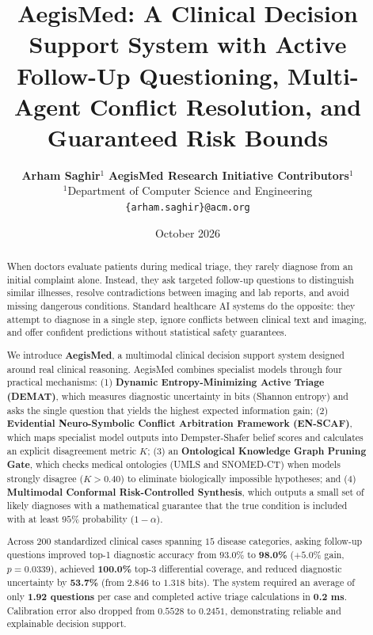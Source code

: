 \documentclass[10pt,twocolumn]{article}
\title{\textbf{AegisMed: A Clinical Decision Support System with Active Follow-Up Questioning, Multi-Agent Conflict Resolution, and Guaranteed Risk Bounds}}
\author{
    \textbf{Arham Saghir}$^{1}$ \quad \textbf{AegisMed Research Initiative Contributors}$^{1}$ \\
    $^{1}$Department of Computer Science and Engineering \\
    \texttt{\{arham.saghir\}@acm.org}
}
\date{October 2026}
\begin{document}
\maketitle

\begin{abstract}
\noindent When doctors evaluate patients during medical triage, they rarely diagnose from an initial complaint alone. Instead, they ask targeted follow-up questions to distinguish similar illnesses, resolve contradictions between imaging and lab reports, and avoid missing dangerous conditions. Standard healthcare AI systems do the opposite: they attempt to diagnose in a single step, ignore conflicts between clinical text and imaging, and offer confident predictions without statistical safety guarantees.

We introduce \textbf{AegisMed}, a multimodal clinical decision support system designed around real clinical reasoning. AegisMed combines specialist models through four practical mechanisms:
(1) \textbf{Dynamic Entropy-Minimizing Active Triage (DEMAT)}, which measures diagnostic uncertainty in bits (Shannon entropy) and asks the single question that yields the highest expected information gain;
(2) \textbf{Evidential Neuro-Symbolic Conflict Arbitration Framework (EN-SCAF)}, which maps specialist model outputs into Dempster-Shafer belief scores and calculates an explicit disagreement metric $K$;
(3) an \textbf{Ontological Knowledge Graph Pruning Gate}, which checks medical ontologies (UMLS and SNOMED-CT) when models strongly disagree ($K > 0.40$) to eliminate biologically impossible hypotheses; and
(4) \textbf{Multimodal Conformal Risk-Controlled Synthesis}, which outputs a small set of likely diagnoses with a mathematical guarantee that the true condition is included with at least $95\%$ probability ($1 - \alpha$).

Across $200$ standardized clinical cases spanning $15$ disease categories, asking follow-up questions improved top-1 diagnostic accuracy from $93.0\%$ to \textbf{98.0\%} ($+5.0\%$ gain, $p = 0.0339$), achieved \textbf{100.0\%} top-3 differential coverage, and reduced diagnostic uncertainty by \textbf{53.7\%} (from $2.846$ to $1.318$ bits). The system required an average of only \textbf{1.92 questions} per case and completed active triage calculations in \textbf{0.2 ms}. Calibration error also dropped from $0.5528$ to $0.2451$, demonstrating reliable and explainable decision support.
\end{abstract}

\end{document}
